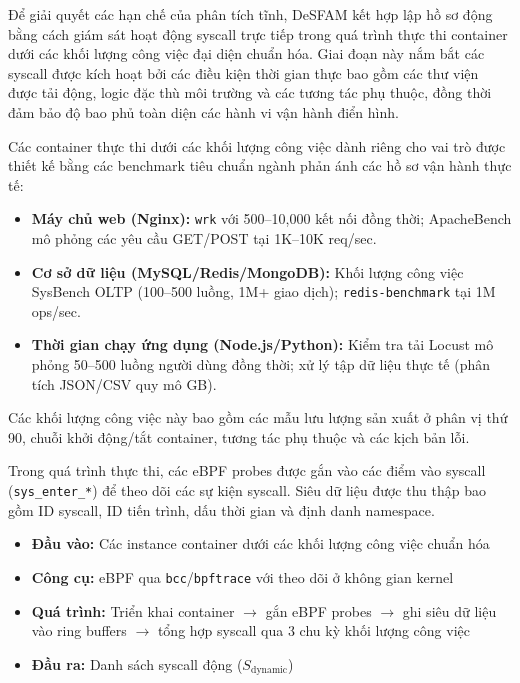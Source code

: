 Để giải quyết các hạn chế của phân tích tĩnh, DeSFAM kết hợp lập hồ sơ động bằng cách giám sát
hoạt động syscall trực tiếp trong quá trình thực thi container dưới các khối lượng công việc đại
diện chuẩn hóa. Giai đoạn này nắm bắt các syscall được kích hoạt bởi các điều kiện thời gian
thực bao gồm các thư viện được tải động, logic đặc thù môi trường và các tương tác phụ thuộc,
đồng thời đảm bảo độ bao phủ toàn diện các hành vi vận hành điển hình.

Các container thực thi dưới các khối lượng công việc dành riêng cho vai trò được thiết kế bằng
các benchmark tiêu chuẩn ngành phản ánh các hồ sơ vận hành thực tế:

\begin{itemize}
  \item \textbf{Máy chủ web (Nginx):} \texttt{wrk} với 500--10,000 kết nối đồng thời;
        ApacheBench mô phỏng các yêu cầu GET/POST tại 1K--10K req/sec.
  \item \textbf{Cơ sở dữ liệu (MySQL/Redis/MongoDB):} Khối lượng công việc SysBench OLTP
        (100--500 luồng, 1M+ giao dịch); \texttt{redis-benchmark} tại 1M ops/sec.
  \item \textbf{Thời gian chạy ứng dụng (Node.js/Python):} Kiểm tra tải Locust mô phỏng 50--500
        luồng người dùng đồng thời; xử lý tập dữ liệu thực tế (phân tích JSON/CSV quy mô GB).
\end{itemize}

Các khối lượng công việc này bao gồm các mẫu lưu lượng sản xuất ở phân vị thứ 90, chuỗi khởi
động/tắt container, tương tác phụ thuộc và các kịch bản lỗi.

Trong quá trình thực thi, các eBPF probes được gắn vào các điểm vào syscall
(\texttt{sys\_enter\_*}) để theo dõi các sự kiện syscall. Siêu dữ liệu được thu thập bao gồm ID
syscall, ID tiến trình, dấu thời gian và định danh namespace.

\begin{itemize}
  \item \textbf{Đầu vào:} Các instance container dưới các khối lượng công việc chuẩn hóa
  \item \textbf{Công cụ:} eBPF qua \texttt{bcc}/\texttt{bpftrace} với theo dõi ở không gian kernel
  \item \textbf{Quá trình:} Triển khai container $\to$ gắn eBPF probes $\to$ ghi siêu dữ liệu
        vào ring buffers $\to$ tổng hợp syscall qua 3 chu kỳ khối lượng công việc
  \item \textbf{Đầu ra:} Danh sách syscall động ($S_{\text{dynamic}}$)
\end{itemize}


